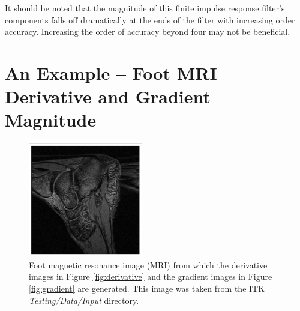\documentclass{InsightArticle}
\begin{document}
It should be noted that the magnitude of this finite impulse response filter's components
falls off dramatically at the ends of the filter with increasing order accuracy.
Increasing the order of accuracy beyond four may not be beneficial.

\section{An Example -- Foot MRI Derivative and Gradient Magnitude}

\begin{figure}
  \begin{center}
    \includegraphics[width=5cm]{Comparisons/foot.png}
  \end{center}
  \caption{Foot magnetic resonance image (MRI) from which the derivative images
  in Figure \ref{fig:derivative} and the gradient images in Figure \ref{fig:gradient} are
  generated.  This image was taken from the ITK \textit{Testing/Data/Input}
  directory.}
  \label{fig:intensity}
\end{figure}
\end{document}
